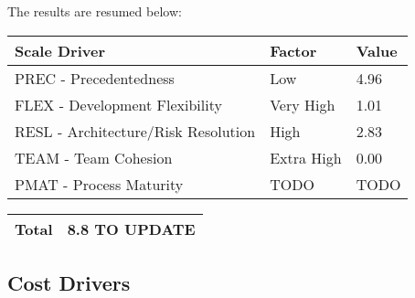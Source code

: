 \documentclass[\mainpath/main]{subfiles}
\begin{document}
The results are resumed below:
\begin{table}[h]
	\begin{tabular}{|L{7.5cm}|C{2.5cm}|C{2cm}|}
		\hline \textbf{Scale Driver} & \textbf{Factor} & \textbf{Value} \\
		\hline PREC - Precedentedness & Low & 4.96 \\
		\hline FLEX - Development Flexibility & Very High & 1.01 \\
		\hline RESL - Architecture/Risk Resolution & High & 2.83 \\
		\hline TEAM - Team Cohesion & Extra High & 0.00 \\
		\hline PMAT - Process Maturity & TODO & TODO \\
		\hline 
	\end{tabular} 
	\begin{tabular}{|L{10.43cm}|C{2cm}|}
		\hline \textbf{Total} & 8.8 TO UPDATE \\
		\hline
	\end{tabular}
\end{table}


\subsection{Cost Drivers}
\end{document}
